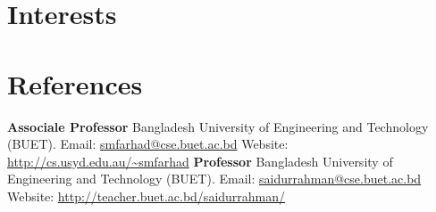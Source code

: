 \documentclass[11pt,a4paper,sans]{moderncv}
\begin{document}


\section{Interests}

\renewcommand{\listitemsymbol}{-~} %

\section{References}
{
\textbf{Associale Professor\newline}
Bangladesh University of Engineering and Technology (BUET).\newline
Email: \url{smfarhad@cse.buet.ac.bd} \newline
Website: \url{http://cs.usyd.edu.au/~smfarhad}
}
{
\textbf{Professor\newline}
Bangladesh University of Engineering and Technology (BUET).\newline
Email: \url{saidurrahman@cse.buet.ac.bd} \newline
Website: \url{http://teacher.buet.ac.bd/saidurrahman/}
}
\end{document}
